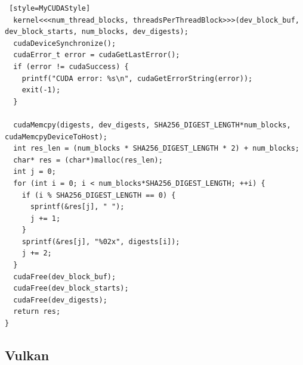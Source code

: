 \documentclass{article}
\begin{document}
\begin{lstlisting} [style=MyCUDAStyle]
  kernel<<<num_thread_blocks, threadsPerThreadBlock>>>(dev_block_buf, dev_block_starts, num_blocks, dev_digests);
  cudaDeviceSynchronize();
  cudaError_t error = cudaGetLastError();
  if (error != cudaSuccess) {
    printf("CUDA error: %s\n", cudaGetErrorString(error));
    exit(-1);
  }

  cudaMemcpy(digests, dev_digests, SHA256_DIGEST_LENGTH*num_blocks, cudaMemcpyDeviceToHost);
  int res_len = (num_blocks * SHA256_DIGEST_LENGTH * 2) + num_blocks;
  char* res = (char*)malloc(res_len);
  int j = 0;
  for (int i = 0; i < num_blocks*SHA256_DIGEST_LENGTH; ++i) {
    if (i % SHA256_DIGEST_LENGTH == 0) {
      sprintf(&res[j], " ");
      j += 1;
    }
    sprintf(&res[j], "%02x", digests[i]);
    j += 2;
  }
  cudaFree(dev_block_buf);
  cudaFree(dev_block_starts);
  cudaFree(dev_digests);
  return res;
}

\end{lstlisting}


\subsection{Vulkan}
\end{document}
